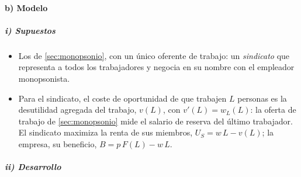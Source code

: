 \documentclass[11pt]{article}
\begin{document}
\paragraph{b) Modelo}

\subparagraph{i) Supuestos}

\begin{itemize}
\item Los de \ref{sec:monopsonio}, con un único oferente de trabajo: un \emph{sindicato} que representa a todos los trabajadores y negocia en su nombre con el empleador monopsonista.
\item Para el sindicato, el coste de oportunidad de que trabajen $L$ personas es la desutilidad agregada del trabajo, $v(L)$, con $v'(L)=w_L(L)$: la oferta de trabajo de \ref{sec:monopsonio} mide el salario de reserva del último trabajador. El sindicato maximiza la renta de sus miembros, $U_S=w\,L-v(L)$; la empresa, su beneficio, $B=p\,F(L)-w\,L$.
\end{itemize}

\subparagraph{ii) Desarrollo}
\end{document}
